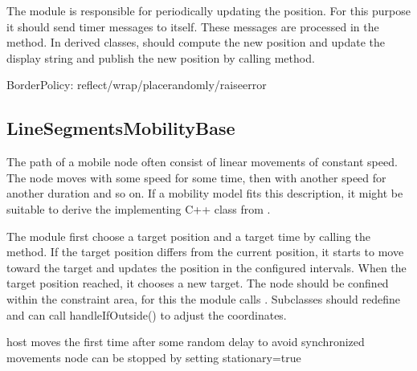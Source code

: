 The module is responsible for periodically updating the position.
For this purpose it should send timer messages to itself. These messages
are processed in the  method. In derived
classes,  should compute the new position
and update the display string and publish the new position by calling
 method.



BorderPolicy: reflect/wrap/placerandomly/raiseerror


\subsection{LineSegmentsMobilityBase}

The path of a mobile node often consist of linear movements of constant
speed. The node moves with some speed for some time, then with another
speed for another duration and so on. If a mobility model fits this
description, it might be suitable to derive the implementing C++ class
from .

The module first choose a target position and a target time by calling
the  method. If the target position differs
from the current position, it starts to move toward the target and
updates the position in the configured  intervals.
When the target position reached, it chooses a new target. The node
should be confined within the constraint area, for this the module calls
. Subclasses should redefine
 and can call handleIfOutside() to
adjust the coordinates.

host moves the first time after some random delay to avoid synchronized movements
node can be stopped by setting stationary=true



